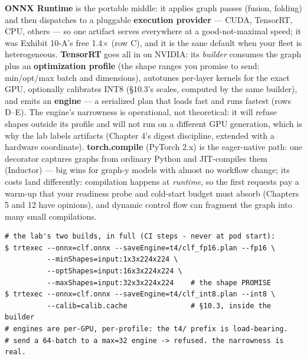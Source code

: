 \textbf{ONNX Runtime} is the portable middle: it applies graph passes (fusion, folding) and then dispatches to a pluggable \textbf{execution provider} — CUDA, TensorRT, CPU, others — so one artifact serves everywhere at a good-not-maximal speed; it was Exhibit 10-A's free 1.4× (row C), and it is the sane default when your fleet is heterogeneous. \textbf{TensorRT} goes all in on NVIDIA: its \textit{builder} consumes the graph plus an \textbf{optimization profile} (the shape ranges you promise to send: min/opt/max batch and dimensions), autotunes per-layer kernels for the exact GPU, optionally calibrates INT8 (§10.3's scales, computed by the same builder), and emits an \textbf{engine} — a serialized plan that loads fast and runs fastest (rows D–E). The engine's narrowness is operational, not theoretical: it will refuse shapes outside its profile and will not run on a different GPU generation, which is why the lab labels artifacts  (Chapter 4's digest discipline, extended with a hardware coordinate). \textbf{torch.compile} (PyTorch 2.x) is the eager-native path: one decorator captures graphs from ordinary Python and JIT-compiles them (Inductor) — big wins for graph-y models with almost no workflow change; its costs land differently: compilation happens at \textit{runtime}, so the first requests pay a warm-up that your readiness probe and cold-start budget must absorb (Chapters 5 and 12 have opinions), and dynamic control flow can fragment the graph into many small compilations.

\begin{terminalbox}
\begin{Verbatim}[breaklines=true,breakanywhere=true,fontsize=\small,formatcom=\color{tbbtermfg},codes=\tbbcodeactive]
# the lab's two builds, in full (CI steps - never at pod start):
$ trtexec --onnx=clf.onnx --saveEngine=t4/clf_fp16.plan --fp16 \
          --minShapes=input:1x3x224x224 \
          --optShapes=input:16x3x224x224 \
          --maxShapes=input:32x3x224x224    # the shape PROMISE
$ trtexec --onnx=clf.onnx --saveEngine=t4/clf_int8.plan --int8 \
          --calib=calib.cache               # §10.3, inside the builder
# engines are per-GPU, per-profile: the t4/ prefix is load-bearing.
# send a 64-batch to a max=32 engine -> refused. the narrowness is real.
\end{Verbatim}
\end{terminalbox}

